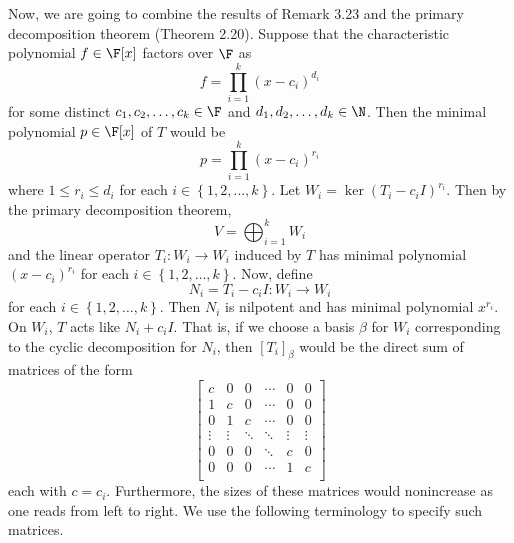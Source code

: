 \documentclass[linearalgebraII]{subfiles}
\begin{document}
    \begin{remark}
        Now, we are going to combine the results of Remark 3.23 and the primary decomposition theorem (Theorem 2.20). Suppose that the characteristic polynomial $f\in\F[x]$ factors over $\F$ as
        \begin{equation*}
            f = \prod^{k}_{i=1} \left( x-c_i \right) ^{d_i}
        \end{equation*}
        for some distinct $c_1,c_2,\ldots,c_k\in\F$ and $d_1,d_2,\ldots,d_k\in\N$. Then the minimal polynomial $p\in\F[x]$ of $T$ would be
        \begin{equation*}
            p = \prod^{k}_{i=1} \left( x-c_i \right) ^{r_i}
        \end{equation*}
        where $1\leq r_i\leq d_i$ for each $i\in\left\lbrace 1,2,\ldots,k \right\rbrace$. Let $W_i = \ker\left( T_i-c_iI \right)^{r_i}$. Then by the primary decomposition theorem,
        \begin{equation*}
            V = \bigoplus^{k}_{i=1} W_i
        \end{equation*}
        and the linear operator $T_i:W_i\to W_i$ induced by $T$ has minimal polynomial $\left( x-c_i \right) ^{r_i}$ for each $i\in\left\lbrace 1,2,\ldots,k \right\rbrace $. Now, define
        \begin{equation*}
            N_i = T_i-c_iI: W_i\to W_i
        \end{equation*}
        for each $i\in\left\lbrace 1,2,\ldots,k \right\rbrace$. Then $N_i$ is nilpotent and has minimal polynomial $x^{r_i}$. On $W_i$, $T$ acts like $N_i+c_iI$. That is, if we choose a basis $\beta$ for $W_i$ corresponding to the cyclic decomposition for $N_i$, then $\left[ T_i \right] _\beta$ would be the direct sum of matrices of the form
        \begin{equation*}
            \begin{bmatrix}
                c & 0 & 0 & \cdots & 0 & 0 \\
                1 & c & 0 & \cdots & 0 & 0 \\
                0 & 1 & c & \cdots & 0 & 0 \\
                \vdots & \vdots & \ddots & \ddots & \vdots & \vdots \\
                0 & 0 & 0 & \ddots & c & 0 \\
                0 & 0 & 0 & \cdots & 1 & c \\
            \end{bmatrix}
        \end{equation*}
        each with $c=c_i$. Furthermore, the sizes of these matrices would nonincrease as one reads from left to right. We use the following terminology to specify such matrices. 
    \end{remark}
\end{document}
